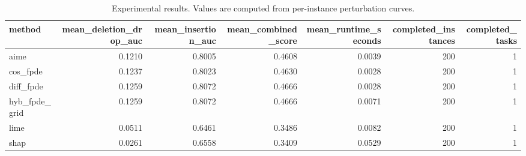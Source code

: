 \begin{table}[t]
\caption{Experimental results. Values are computed from per-instance perturbation curves.}
\label{tab:main_results_computed}
\centering
\begin{tabular}{lrrrrrr}
\toprule
method & mean\_deletion\_drop\_auc & mean\_insertion\_auc & mean\_combined\_score & mean\_runtime\_seconds & completed\_instances & completed\_tasks \\
\midrule
aime & 0.1210 & 0.8005 & 0.4608 & 0.0039 & 200 & 1 \\
cos\_fpde & 0.1237 & 0.8023 & 0.4630 & 0.0028 & 200 & 1 \\
diff\_fpde & 0.1259 & 0.8072 & 0.4666 & 0.0028 & 200 & 1 \\
hyb\_fpde\_grid & 0.1259 & 0.8072 & 0.4666 & 0.0071 & 200 & 1 \\
lime & 0.0511 & 0.6461 & 0.3486 & 0.0082 & 200 & 1 \\
shap & 0.0261 & 0.6558 & 0.3409 & 0.0529 & 200 & 1 \\
\bottomrule
\end{tabular}

\end{table}
